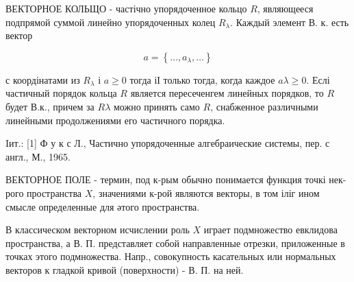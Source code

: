 \documentclass[10pt]{article}
\begin{document}
ВЕКТОРНОЕ КОЛЬЩО - частічно упорядоченное кольцо $R$, являющееся подпрямой суммой линейно упорядоченных колец $R_{\lambda}$. Каждый элемент В. к. есть вектор



\[

a=\left\{\ldots, a_{\lambda}, \ldots\right\}

\]



с коордінатами из $R_{\lambda}$ і $a \geqslant 0$ тогда іІ только тогда, когда каждое $a \lambda \geqslant 0$. Еслі частичный порядок кольца $R$ является пересеченгем линейных порядков, то $R$ будет В.к., причем за $R \lambda$ можно принять само $R$, снабженное различными линейными продолжениями его частичного порядка.



Iит.: [1] Ф у к с Л., Частично упорядоченные алгебраические системы, пер. с англ., М., 1965.



ВЕКТОРНОЕ ПОЛЕ - термин, под к-рым обычно понимается функция точкі нек-рого пространства $X$, значениями к-рой являются векторы, в том іліг ином смысле определенные для әтого пространства.



В классическом векторном исчислении роль $X$ играет подмножество евклидова пространства, а В. П. представляет собой направленные отрезки, приложенные в точках этого подмножества. Напр., совокупность касательных или нормальных векторов к гладкой кривой (поверхности) - В. П. на ней.
\end{document}
